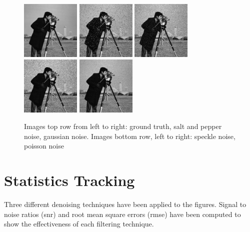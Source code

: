 \documentclass{article}
\begin{document}
\begin{figure}[H]
  \centering
  \includegraphics[width=0.25\textwidth]{images/camera_truth}
  \includegraphics[width=0.25\textwidth]{images/camera_noisy1}
  \includegraphics[width=0.25\textwidth]{images/camera_noisy2}
  \includegraphics[width=0.25\textwidth]{images/camera_noisy3}
  \includegraphics[width=0.25\textwidth]{images/camera_noisy4}
  \caption{Images top row from left to right: ground truth, salt and pepper
    noise, gaussian noise. Images bottom row, left to right: speckle noise, poisson noise}
\end{figure}   
% 
\section{Statistics Tracking}
\label{sec:stats-tracking}
% 
Three different denoising techniques have been applied to the
figures. Signal to noise ratios (snr) and root mean
square errors (rmse) have been computed to show the effectiveness of each
filtering technique.
% 
\end{document}
